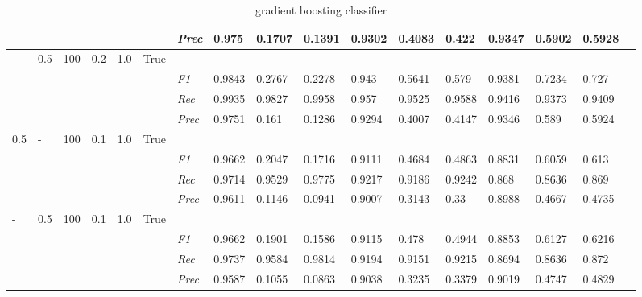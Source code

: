 \begin{table}[]
\begin{tabularx}{\textwidth}{XXXXXX|X|XXX|XXX|XXXX}
& & & & & & \textit{Prec} & 0.975 & 0.1707 & 0.1391 & 0.9302 & 0.4083 & 0.422 & 0.9347 & 0.5902 & 0.5928 \\ \midrule
- & 0.5 & 100 & 0.2 & 1.0 &True & & & & & & & & & \\
& & & & & & \textit{F1} & 0.9843 & 0.2767 & 0.2278 & 0.943 & 0.5641        & 0.579        & 0.9381        & 0.7234        & 0.727        \\
& & & & & & \textit{Rec} & 0.9935 & 0.9827 & 0.9958    & 0.957 & 0.9525    & 0.9588    & 0.9416    & 0.9373    & 0.9409    \\
& & & & & & \textit{Prec} & 0.9751 & 0.161 & 0.1286 & 0.9294 & 0.4007 & 0.4147 & 0.9346 & 0.589 & 0.5924 \\ \midrule
0.5 & - & 100 & 0.1 & 1.0 &True & & & & & & & & & \\
& & & & & & \textit{F1} & 0.9662 & 0.2047 & 0.1716 & 0.9111 & 0.4684        & 0.4863        & 0.8831        & 0.6059        & 0.613        \\
& & & & & & \textit{Rec} & 0.9714 & 0.9529 & 0.9775    & 0.9217 & 0.9186    & 0.9242    & 0.868    & 0.8636    & 0.869    \\
& & & & & & \textit{Prec} & 0.9611 & 0.1146 & 0.0941 & 0.9007 & 0.3143 & 0.33 & 0.8988 & 0.4667 & 0.4735 \\ \midrule
- & 0.5 & 100 & 0.1 & 1.0 &True & & & & & & & & & \\
& & & & & & \textit{F1} & 0.9662 & 0.1901 & 0.1586 & 0.9115 & 0.478        & 0.4944        & 0.8853        & 0.6127        & 0.6216        \\
& & & & & & \textit{Rec} & 0.9737 & 0.9584 & 0.9814    & 0.9194 & 0.9151    & 0.9215    & 0.8694    & 0.8636    & 0.872    \\
& & & & & & \textit{Prec} & 0.9587 & 0.1055 & 0.0863 & 0.9038 & 0.3235 & 0.3379 & 0.9019 & 0.4747 & 0.4829 \\ \midrule
\end{tabularx}
\caption{gradient boosting classifier}
\label{tab:all_results_gradient_boosting_classifier}
\end{table}

